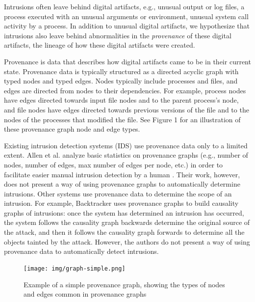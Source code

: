 \documentclass[10pt,twocolumn]{article}
\begin{document}
Intrusions often leave behind digital artifacts, e.g., unusual output or log files, a process executed
with an unusual arguments or environment, unusual system call activity by a process. In addition to
unusual digital artifacts, we hypothesize that
intrusions also leave behind abnormalities
in the {\em provenance} of these digital artifacts, the lineage of how these digital artifacts were created.

Provenance is data that describes how digital artifacts
came to be in their current state. Provenance data is typically structured as a directed acyclic graph with
typed nodes and typed edges.
Nodes typically include processes and files, and edges are directed from nodes to their dependencies. For example,
process nodes have edges directed towards input file nodes and to the parent process's node, and
file nodes have edges directed towards previous versions of the file and to the nodes of the
processes that modified the file. See Figure 1 for an illustration of these provenance
graph node and edge types.

Existing intrusion detection systems (IDS) use provenance data only to a limited extent.
Allen et al. analyze
basic statistics on provenance graphs (e.g., number of nodes, number of edges, max number of edges per node, etc.) in order to facilitate
easier manual intrusion detection by a human \cite{provstat}. Their work, however, does not present a way of using provenance
graphs to automatically determine intrusions. Other systems use provenance data to determine the scope of an
intrusion. For example, Backtracker \cite{backtracker} uses provenance graphs to build causality graphs of intrusions: once the
system has
determined an intrusion has occurred, the system follows the causality graph backwards determine the original source of the attack, and 
then it follows the causality graph forwards to determine all the objects tainted by the attack. However, the authors 
do not present a way of using provenance data to automatically detect intrusions.

\begin{figure}
  \label{graph-simple}
  \centering
    \texttt{[image: img/graph-simple.png]}
    \caption{Example of a simple provenance graph, showing the types of nodes and edges common in provenance graphs} 
\end{figure}
\end{document}
